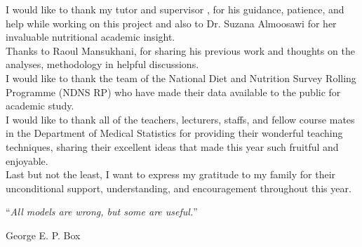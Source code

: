 \documentclass[
12pt, %
english, %
singlespacing, %
headsepline, %
table]{MastersDoctoralThesis} %
\begin{document}
\begin{acknowledgements}
\addchaptertocentry{\acknowledgementname} %
\vspace{0.8cm}
I would like to thank my tutor and supervisor \supname, for his guidance, patience, and help while working on this project and also to Dr. Suzana Almoosawi for her invaluable nutritional academic insight. \\

Thanks to Raoul Mansukhani, for sharing his previous work and thoughts on the analyses, methodology in helpful discussions.	 \\

I would like to thank the team of the National Diet and Nutrition Survey Rolling Programme (NDNS RP) who have made their data available to the public for academic study. \\

I would like to thank all of the teachers, lecturers, staffs, and fellow course mates in the Department of Medical Statistics for providing their wonderful teaching techniques, sharing their excellent ideas that made this year such fruitful and enjoyable.\\


Last but not the least, I want to express my gratitude to my family for their unconditional support, understanding, and encouragement throughout this year. \\

\end{acknowledgements}


\cleardoublepage


\vspace*{0.2\textheight}

\noindent\enquote{\itshape All models are wrong, but some are useful.}\bigbreak

\hfill George E. P. Box

\end{document}
